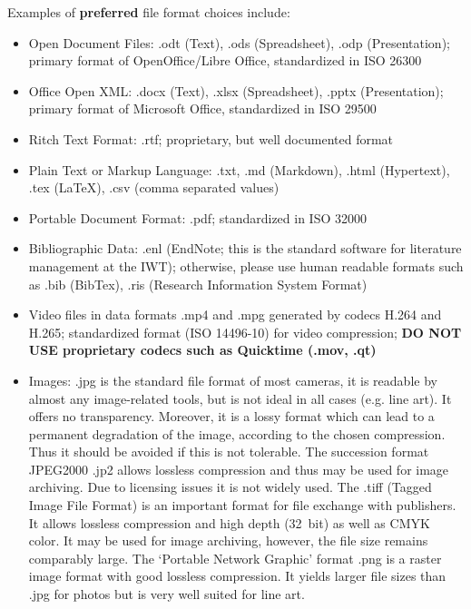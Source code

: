 \noindent Examples of \textbf{preferred} file format choices include:
\begin{itemize}
  \item Open Document Files: .odt (Text), .ods (Spreadsheet),
        .odp (Presentation); primary format of OpenOffice/Libre Office,
        standardized in ISO 26300
  \item Office Open XML: .docx (Text), .xlsx (Spreadsheet),
        .pptx (Presentation); primary format of Microsoft Office,
        standardized in ISO 29500
  \item Ritch Text Format: .rtf; proprietary, but well documented format
  \item Plain Text or Markup Language: .txt, .md (Markdown), .html (Hypertext),
       .tex (LaTeX), .csv (comma separated values)
  \item Portable Document Format: .pdf; standardized in ISO 32000
  \item Bibliographic Data: .enl (EndNote; this is the standard software for
        literature management at the IWT); otherwise, please use human readable
        formats such as .bib (BibTex), .ris (Research Information System Format)
  \item Video files in data formats .mp4 and .mpg generated by codecs H.264 and
        H.265; standardized format (ISO 14496-10) for video compression;
        \textbf{DO NOT USE proprietary \linebreak codecs such as Quicktime (.mov, .qt)}
  \item Images: .jpg is the standard file format of most cameras, it is readable
        by almost any image-related tools, but is not ideal in all cases (e.g.
        line art). It offers no transparency. Moreover, it is a lossy format
        which can lead to a permanent degradation of the image, according to the
        chosen compression. Thus it should be avoided if this is not tolerable.
        The succession format JPEG2000 .jp2 allows lossless compression and thus
        may be used for image archiving. Due to licensing issues it is not
        widely used. The .tiff (Tagged Image File Format) is an important format
        for file exchange with publishers. It allows lossless compression and
        high depth (32 bit) as well as CMYK color. It may be used for image
        archiving, however, the file size remains comparably large. The
        `Portable Network Graphic' format .png is a raster image format with
        good lossless compression. It yields larger file sizes than .jpg for
        photos but is very well suited for line art.

\end{itemize}
